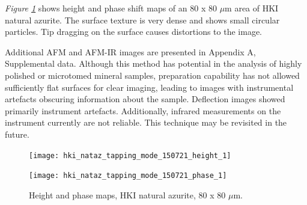 \textit{Figure \ref{fig:afm_hki_nataz_height_phase_1}} shows height and phase shift maps of an 80 x 80 $\mu$m area of HKI natural azurite. The surface texture is very dense and shows small circular particles. Tip dragging on the surface causes distortions to the image. 

Additional AFM and AFM-IR images are presented in Appendix A, Supplemental data. Although this method has potential in the analysis of highly polished or microtomed mineral samples, preparation capability has not allowed sufficiently flat surfaces for clear imaging, leading to images with instrumental artefacts obscuring information about the sample. Deflection images showed primarily instrument artefacts. Additionally, infrared measurements on the instrument currently are not reliable. This technique may be revisited in the future.

\begin{figure}[H]
\centering
\begin{minipage}{.45\textwidth}
  \centering
  \texttt{[image: hki\_nataz\_tapping\_mode\_150721\_height\_1]}
\end{minipage}
\begin{minipage}{.45\textwidth}
  \centering
  \texttt{[image: hki\_nataz\_tapping\_mode\_150721\_phase\_1]}
\end{minipage}
\caption[Height and phase maps, HKI natural azurite]{Height and phase maps, HKI natural azurite, 80 x 80 $\mu$m.}
\label{fig:afm_hki_nataz_height_phase_1}
\end{figure}




